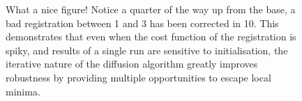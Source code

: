 \begin{figure}
    \caption{What a nice figure! Notice a quarter of the way up from the base, a bad registration between 1 and 3 has been corrected in 10. This demonstrates that even when the cost function of the registration is spiky, and results of a single run are sensitive to initialisation, the iterative nature of the diffusion algorithm greatly improves robustness by providing multiple opportunities to escape local minima.}
    \label{fig:dummy_cross_sections}
  \end{figure}
  
